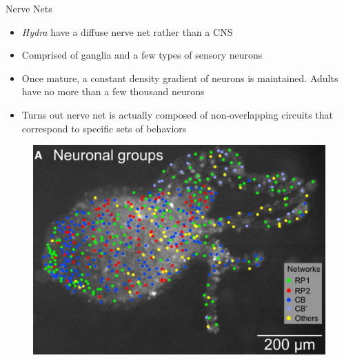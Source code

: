 \documentclass[leqno,presentation,unknownkeysallowed]{beamer}
\begin{document}
\begin{frame}{Nerve Nets}
\begin{itemize}
\item \textit{Hydra} have a diffuse nerve net rather than a CNS
\item Comprised of ganglia and a few types of sensory neurons
\item Once mature, a constant density gradient of neurons is maintained. Adults have no more than a few thousand neurons
\item Turns out nerve net is actually composed of non-overlapping circuits that correspond to specific sets of behaviors
\end{itemize}
\begin{figure}
\centering
\includegraphics[scale=0.25]{hydra_map.png}
\end{figure}
\end{frame}
\end{document}
